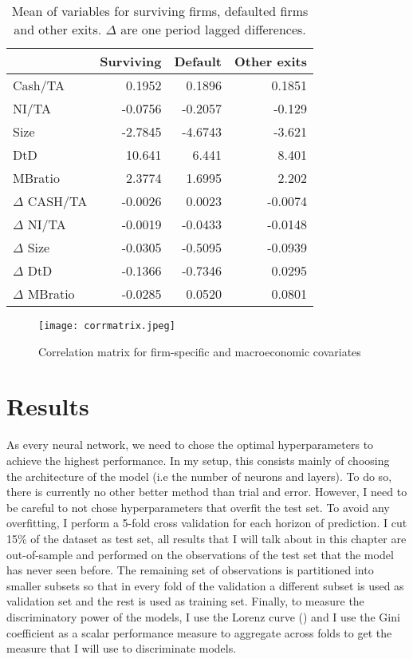 \begin{table}[]
    \centering
    \begin{tabular}{lrrr}
    \hline \hline
                 & Surviving &   Default  & Other exits \\
    \hline
Cash/TA          &  0.1952 &  0.1896  &    0.1851 \\
NI/TA            & -0.0756 & -0.2057  &   -0.129 \\
Size             & -2.7845 & -4.6743  &   -3.621 \\
DtD              & 10.641 &  6.441  &    8.401 \\
MBratio          &  2.3774 &  1.6995  &    2.202 \\
$\Delta$ CASH/TA  & -0.0026 &  0.0023  &   -0.0074 \\
$\Delta$   NI/TA     & -0.0019 & -0.0433  &   -0.0148 \\
$\Delta$  Size      & -0.0305 & -0.5095  &   -0.0939 \\
$\Delta$   DtD       & -0.1366 & -0.7346  &    0.0295 \\
$\Delta$  MBratio   & -0.0285 &  0.0520  &    0.0801 \\
\hline
    \end{tabular}
    \caption{Mean of variables for surviving firms, defaulted firms and other exits. $\Delta$ are one period lagged differences.}
    \label{tab:meanvar}
\end{table}


\begin{figure}[]
    \centering
    \texttt{[image: corrmatrix.jpeg]}
    \caption{Correlation matrix for firm-specific and macroeconomic covariates}
    \label{fig:corrmat}
\end{figure}

\section{Results}
\label{sec4}


As every neural network, we need to chose the optimal hyperparameters to achieve the highest performance. In my setup, this consists mainly of choosing the architecture of the model (i.e the number of neurons and layers). To do so, there is currently no other better method than trial and error. However, I need to be careful to not chose hyperparameters that overfit the test set. To avoid any overfitting, I perform a 5-fold cross validation for each horizon of prediction. I cut 15\% of the dataset as test set, all results that I will talk about in this chapter are out-of-sample and performed on the observations of the test set that the model has never seen before. The remaining set of observations is partitioned into smaller subsets so that in every fold of the validation a different subset is used as validation set and the rest is used as training set. Finally, to measure the discriminatory power of the models, I use the Lorenz curve (\citet{lorenz}) and I use the Gini coefficient as a scalar performance measure to aggregate across folds to get the  measure that I will use to discriminate models. \\

